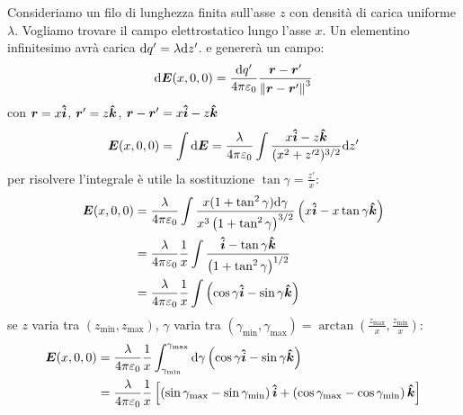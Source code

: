 \begin{Es}
  Consideriamo un filo di lunghezza finita sull'asse $z$ con densità di carica uniforme $\lambda$. Vogliamo trovare il campo elettrostatico lungo l'asse $x$. Un elementino infinitesimo avrà carica $\mathrm{d} q'=\lambda\mathrm{d} z'$. e genererà un campo:
  \[
    \mathrm{d}\boldsymbol{E}(x,0,0) = \frac{\mathrm{d} q'}{4\pi\varepsilon_0}\frac{\boldsymbol{r}-\boldsymbol{r}'}{\left\lVert\boldsymbol{r}-\boldsymbol{r}'\right\rVert^3}
  \]
  con $\boldsymbol{r}=x\boldsymbol{\hat {i}}$, $\boldsymbol{r}'=z\boldsymbol{\hat {k}}$, $\boldsymbol{r}-\boldsymbol{r}'=x\boldsymbol{\hat {i}}-z \boldsymbol{\hat {k}}$
  \[
    \boldsymbol{E}(x,0,0)=\int\mathrm{d} \boldsymbol{E}=\frac{\lambda}{4\pi\varepsilon_0}\int\frac{x\boldsymbol{\hat {i}}-z\boldsymbol{\hat {k}}}{(x^2+z'^2)^{3/2}}\mathrm{d} z'
  \]
  per risolvere l'integrale è utile la sostituzione $\tan\gamma=\frac{z'}{x}$:
  \begin{align*}
    \boldsymbol{E}(x,0,0) & =\frac{\lambda}{4\pi\varepsilon_0}\int\frac{x(1+\tan^2\gamma)\mathrm{d}\gamma}{x^3\left(1+\tan^2\gamma\right)^{3/2}}\left(x\boldsymbol{\hat {i}}-x\tan\gamma\boldsymbol{\hat {k}}\right) \\
                 & =\frac{\lambda}{4\pi\varepsilon_0}\frac{1}{x}\int\frac{\boldsymbol{\hat {i}}-\tan\gamma\boldsymbol{\hat {k}}}{\left(1+\tan^2\gamma\right)^{1/2}}                                  \\
                 & =\frac{\lambda}{4\pi\varepsilon_0}\frac{1}{x}\int\left(\cos\gamma\boldsymbol{\hat {i}}-\sin\gamma\boldsymbol{\hat {k}}\right)
  \end{align*}
  se $z$ varia tra $(z_\text{min},z_\text{max})$, $\gamma$ varia tra $(\gamma_\text{min},\gamma_\text{max})=\arctan\left(\frac{z_\text{max}}{x},\frac{z_\text{min}}{x}\right)$:
  \begin{align*}
    \boldsymbol{E}(x,0,0) & =\frac{\lambda}{4\pi\varepsilon_0}\frac{1}{x}\int_{\gamma_{\text{min}}}^{\gamma_{\text{max}}}\mathrm{d}\gamma\left(\cos\gamma\boldsymbol{\hat {i}}-\sin\gamma\boldsymbol{\hat {k}}\right)                                    \\
                 & =\frac{\lambda}{4\pi\varepsilon_0}\frac{1}{x}\left[\left(\sin\gamma_\text{max}-\sin\gamma_\text{min}\right)\boldsymbol{\hat {i}}+\left(\cos\gamma_\text{max}-\cos\gamma_\text{min}\right)\boldsymbol{\hat {k}}\right]
  \end{align*}



\end{Es}


